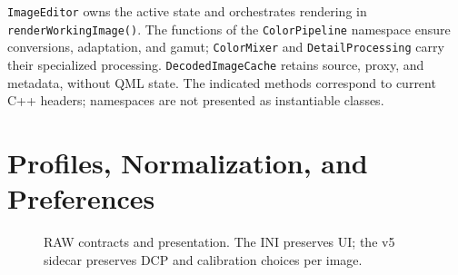 \texttt{ImageEditor} owns the active state and orchestrates rendering in \texttt{renderWorkingImage()}. The functions of the \texttt{ColorPipeline} namespace ensure conversions, adaptation, and gamut; \texttt{ColorMixer} and \texttt{DetailProcessing} carry their specialized processing. \texttt{DecodedImageCache} retains source, proxy, and metadata, without QML state. The indicated methods correspond to current C++ headers; namespaces are not presented as instantiable classes.

\section{Profiles, Normalization, and Preferences}

\begin{figure}[htbp]
\centering
{}
\caption{RAW contracts and presentation. The INI preserves UI; the v5 sidecar preserves DCP and calibration choices per image.}
\end{figure}
